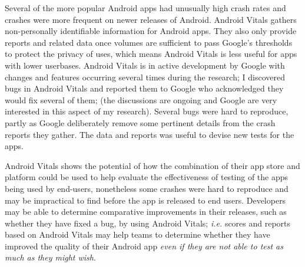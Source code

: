 \begin{SingleSpace}
Several of the more popular Android apps had unusually high crash rates and crashes were more frequent on newer releases of Android. %
Android Vitals gathers non-personally identifiable information for Android apps. They also only provide reports and related data once volumes are sufficient to pass Google's thresholds to protect the privacy of uses, which means Android Vitals is less useful for apps with lower userbases. %
Android Vitals is in active development by Google with changes and features occurring several times during the research; I discovered bugs in Android Vitals and reported them to Google who acknowledged they would fix several of them; (the discussions are ongoing and Google are very interested in this aspect of my research).
Several bugs were hard to reproduce, partly as Google deliberately remove some pertinent details from the crash reports they gather. The data and reports was useful to devise new tests for the apps.

Android Vitals shows the potential of how the combination of their app store and platform could be used to help evaluate the effectiveness of testing of the apps being used by end-users, nonetheless some crashes were hard to reproduce and may be impractical to find before the app is released to end users. Developers may be able to determine comparative improvements in their releases, such as whether they have fixed a bug, by using Android Vitals; \textit{i.e.} scores and reports based on Android Vitals may help teams to determine whether they have improved the quality of their Android app \textit{even if they are not able to test as much as they might wish}.
\end{SingleSpace}
\newpage
